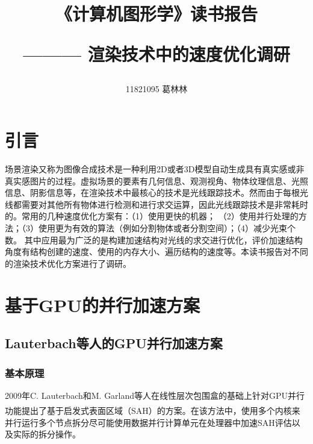 \documentclass[11pt]{article}
\title{《计算机图形学》读书报告  \begin{large} \hspace{5pt}——— \hspace{5pt}  渲染技术中的速度优化调研\end{large} }
\author{11821095 葛林林}
\newcommand{\upcite}[1]{\textsuperscript{\textsuperscript{\cite{#1}}}}
\begin{document}
\maketitle
\section{引言}
场景渲染又称为图像合成技术是一种利用2D或者3D模型自动生成具有真实感或非真实感图片的过程。虚拟场景的要素有几何信息、观测视角、物体纹理信息、光照信息、阴影信息等，在渲染技术中最核心的技术是光线跟踪技术。然而由于每根光线都需要对其他所有物体进行检测和进行求交运算，因此光线跟踪技术是非常耗时的。常用的几种速度优化方案有：（1）使用更快的机器；
（2）使用并行处理的方法；（3）使用更为有效的算法（例如分割物体或者分割空间）；（4）减少光束个数。
其中应用最为广泛的是构建加速结构对光线的求交进行优化，评价加速结构角度有结构创建的速度、使用的内存大小、遍历结构的速度等。本读书报告对不同的渲染技术优化方案进行了调研。



\section{基于GPU的并行加速方案}
\subsection{Lauterbach等人的GPU并行加速方案}
\subsubsection{基本原理}
2009年C. Lauterbach和M. Garland等人在线性层次包围盒的基础上针对GPU并行功能提出了基于启发式表面区域（SAH）的方案\upcite{LBVH}。在该方法中，使用多个内核来并行运行多个节点拆分尽可能使用数据并行计算单元在处理器中加速SAH评估以及实际的拆分操作。
\end{document}
